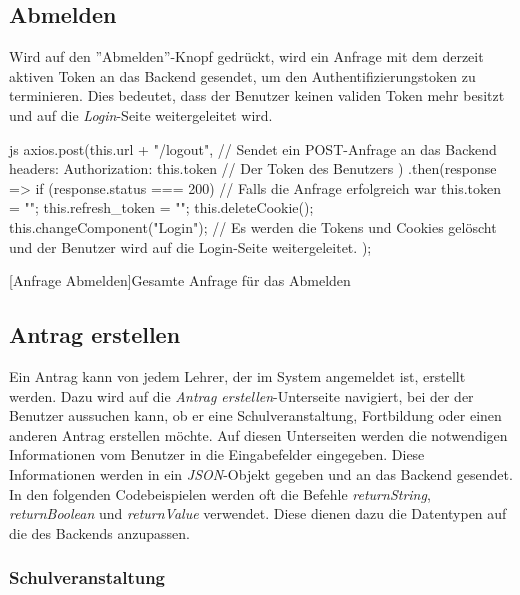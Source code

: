 \subsection{Abmelden}
Wird auf den ''Abmelden''-Knopf gedrückt, wird ein Anfrage mit dem derzeit aktiven Token an das Backend gesendet, um den Authentifizierungstoken zu terminieren. Dies bedeutet, dass der Benutzer keinen validen Token mehr besitzt und auf die \textit{Login}-Seite weitergeleitet wird.
\begin{code}{js}
axios.post(this.url + "/logout", {	// Sendet ein POST-Anfrage an das Backend
	headers: { Authorization: this.token }	// Der Token des Benutzers
})
.then(response => {
	if (response.status === 200) {	// Falls die Anfrage erfolgreich war
		this.token = "";
		this.refresh_token = "";
		this.deleteCookie();
		this.changeComponent("Login");	// Es werden die Tokens und Cookies gelöscht und der Benutzer wird auf die Login-Seite weitergeleitet.
	}
});
\end{code}
[Anfrage Abmelden]{Gesamte Anfrage für das Abmelden}~\\
\newpage
\subsection{Antrag erstellen}
Ein Antrag kann von jedem Lehrer, der im System angemeldet ist, erstellt werden. Dazu wird auf die \textit{Antrag erstellen}-Unterseite navigiert, bei der der Benutzer aussuchen kann, ob er eine Schulveranstaltung, Fortbildung oder einen anderen Antrag erstellen möchte. Auf diesen Unterseiten werden die notwendigen Informationen vom Benutzer in die Eingabefelder eingegeben. Diese Informationen werden in ein \textit{JSON}-Objekt gegeben und an das Backend gesendet.
\\
In den folgenden Codebeispielen werden oft die Befehle \textit{returnString}, \textit{returnBoolean} und \textit{returnValue} verwendet. Diese dienen dazu die Datentypen auf die des Backends anzupassen. 
\subsubsection{Schulveranstaltung}

